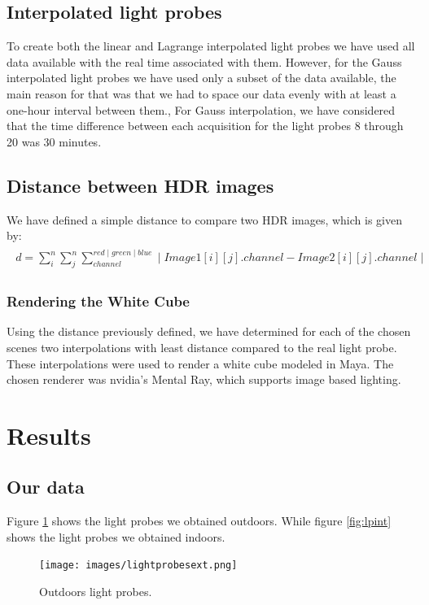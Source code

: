 \documentclass[conference]{acmsiggraph}
\begin{document}
\subsection{Interpolated light probes}
	To create both the linear and Lagrange interpolated light probes we have used all data available with the real time associated with them. 
However, for the Gauss interpolated light probes we have used only a subset of the data available, the main reason for that was that we had to space our data evenly with at least a one-hour interval between them., For Gauss interpolation, we have considered that the time difference between each acquisition for the light probes 8 through 20 was 30 minutes.

\subsection{Distance between HDR images}
	We have defined a simple distance to compare two HDR images, which is given by:
\begin{align}
\begin{split}
	d = \sum\limits_{i}^{n} \sum\limits_{j}^{n} \sum\limits_{channel}^{red\mid green\mid blue} \mid Image1[i][j].channel - Image2[i][j].channel \mid
\end{split}
\end{align}

\subsubsection{Rendering the White Cube}
	Using the distance previously defined, we have determined for each of the chosen scenes two interpolations with least distance compared to the real light probe. These interpolations were used to render a white cube modeled in Maya. The chosen renderer was nvidia's Mental Ray, which supports image based lighting.

\section{Results}

\subsection{Our data}
	Figure  \ref{fig:lpext} shows the light probes we obtained outdoors. While figure  \ref{fig:lpint} shows the light probes we obtained indoors.


	\begin{figure}[!ht]
		\caption{Outdoors light probes.}
		\centering
		\texttt{[image: images/lightprobesext.png]}
		\label{fig:lpext}
	\end{figure}
\end{document}

